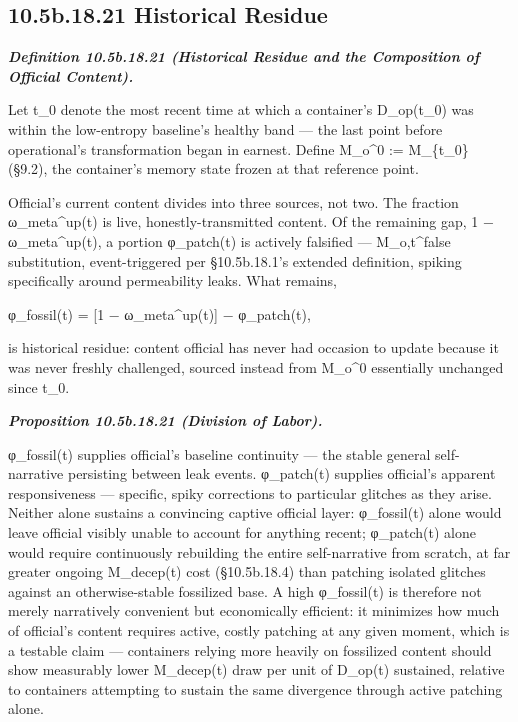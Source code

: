 \documentclass[
]{article}
\begin{document}
\hypertarget{b.18.21-historical-residue}{%
\subsection{10.5b.18.21 Historical
Residue}\label{b.18.21-historical-residue}}

\emph{\textbf{Definition 10.5b.18.21 (Historical Residue and the
Composition of Official Content).}}

Let t\_0 denote the most recent time at which a container's D\_op(t\_0)
was within the low-entropy baseline's healthy band --- the last point
before operational's transformation began in earnest. Define M\_o\^{}0
:= M\_\{t\_0\} (§9.2), the container's memory state frozen at that
reference point.

Official's current content divides into three sources, not two. The
fraction ω\_meta\^{}up(t) is live, honestly-transmitted content. Of the
remaining gap, 1 − ω\_meta\^{}up(t), a portion φ\_patch(t) is actively
falsified --- M\_o,t\^{}false substitution, event-triggered per
§10.5b.18.1's extended definition, spiking specifically around
permeability leaks. What remains,

φ\_fossil(t) = {[}1 − ω\_meta\^{}up(t){]} − φ\_patch(t),

is historical residue: content official has never had occasion to update
because it was never freshly challenged, sourced instead from M\_o\^{}0
essentially unchanged since t\_0.

\emph{\textbf{Proposition 10.5b.18.21 (Division of Labor).}}

φ\_fossil(t) supplies official's baseline continuity --- the stable
general self-narrative persisting between leak events. φ\_patch(t)
supplies official's apparent responsiveness --- specific, spiky
corrections to particular glitches as they arise. Neither alone sustains
a convincing captive official layer: φ\_fossil(t) alone would leave
official visibly unable to account for anything recent; φ\_patch(t)
alone would require continuously rebuilding the entire self-narrative
from scratch, at far greater ongoing M\_decep(t) cost (§10.5b.18.4) than
patching isolated glitches against an otherwise-stable fossilized base.
A high φ\_fossil(t) is therefore not merely narratively convenient but
economically efficient: it minimizes how much of official's content
requires active, costly patching at any given moment, which is a
testable claim --- containers relying more heavily on fossilized content
should show measurably lower M\_decep(t) draw per unit of D\_op(t)
sustained, relative to containers attempting to sustain the same
divergence through active patching alone.
\end{document}
